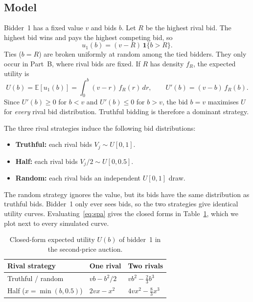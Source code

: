 \documentclass[11pt,a4paper]{article}
\begin{document}
\subsection{Model}
Bidder~1 has a fixed value $v$ and bids $b$. Let $R$ be the highest rival bid. The highest bid
wins and pays the highest competing bid, so
\begin{equation}
u_1(b) = (v - R)\,\mathbf{1}\{b > R\}.
\end{equation}
Ties ($b=R$) are broken uniformly at random among the tied bidders. They only occur in Part~B,
where rival bids are fixed. If $R$ has density $f_R$, the expected utility is
\begin{equation}\label{eq:spa}
U(b) = \mathbb{E}[u_1(b)] = \int_0^{b} (v-r)\,f_R(r)\,dr,
\qquad U'(b) = (v-b)\,f_R(b).
\end{equation}
Since $U'(b)\ge 0$ for $b<v$ and $U'(b)\le 0$ for $b>v$, the bid $b=v$ maximises $U$ for
\emph{every} rival bid distribution. Truthful bidding is therefore a dominant strategy.

The three rival strategies induce the following bid distributions:
\begin{itemize}[itemsep=0.1em]
  \item \textbf{Truthful:} each rival bids $V_j\sim U[0,1]$.
  \item \textbf{Half:} each rival bids $V_j/2\sim U[0,0.5]$.
  \item \textbf{Random:} each rival bids an independent $U[0,1]$ draw.
\end{itemize}
The random strategy ignores the value, but its bids have the same distribution as truthful bids.
Bidder~1 only ever sees bids, so the two strategies give identical utility curves.
Evaluating~\eqref{eq:spa} gives the closed forms in Table~\ref{tab:closed}, which we plot next to
every simulated curve.

\begin{table}[!htbp]
\centering
\caption{Closed-form expected utility $U(b)$ of bidder~1 in the second-price auction.}
\label{tab:closed}
\begin{tabular}{lll}
\toprule
Rival strategy & One rival & Two rivals \\
\midrule
Truthful / random & $vb - b^2/2$ & $vb^2 - \tfrac{2}{3}b^3$ \\
Half ($x=\min(b,0.5)$) & $2vx - x^2$ & $4vx^2 - \tfrac{8}{3}x^3$ \\
\bottomrule
\end{tabular}
\end{table}
\end{document}
